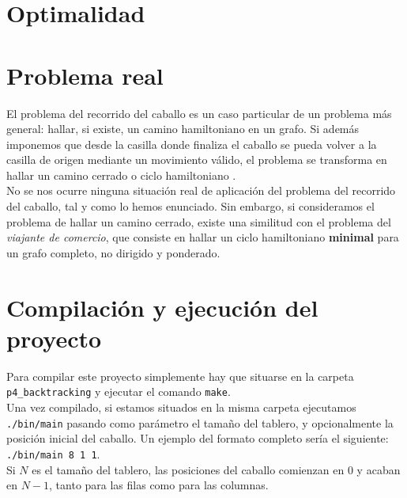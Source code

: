 \documentclass[11pt]{article}
\begin{document}

\section*{Optimalidad}





\section*{Problema real}

El problema del recorrido del caballo es un caso particular de un problema más general: hallar, si existe, un camino hamiltoniano \cite{wiki} en un grafo. Si además imponemos que desde la casilla donde finaliza el caballo se pueda volver a la casilla de origen mediante un movimiento válido, el problema se transforma en hallar un camino cerrado o ciclo hamiltoniano \cite{wiki}.\\

No se nos ocurre ninguna situación real de aplicación del problema del recorrido del caballo, tal y como lo hemos enunciado. Sin embargo, si consideramos el problema de hallar un camino cerrado, existe una similitud con el problema del \textit{viajante de comercio}, que consiste en hallar un ciclo hamiltoniano \textbf{minimal} para un grafo completo, no dirigido y ponderado.\\

\section*{Compilación y ejecución del proyecto}
Para compilar este proyecto simplemente hay que situarse en la carpeta \verb|p4_backtracking| y ejecutar el comando \verb|make|.\\

Una vez compilado, si estamos situados en la misma carpeta ejecutamos \verb|./bin/main| pasando como parámetro el tamaño del tablero, y opcionalmente la posición inicial del caballo. Un ejemplo del formato completo sería el siguiente: \verb|./bin/main 8 1 1|.\\

Si $N$ es el tamaño del tablero, las posiciones del caballo comienzan en $0$ y acaban en $N-1$, tanto para las filas como para las columnas.
\end{document}
